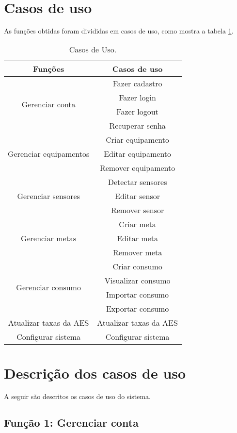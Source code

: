 \section{Casos de uso}
As funções obtidas foram divididas em casos de uso, como mostra a tabela \ref{tab:casos_de_uso}.
%
\begin{table}[H]
\centering
{\renewcommand{\arraystretch}{1.5}
\renewcommand{\tabcolsep}{0.2cm}
\begin{tabular}{|c|c|}
\hline
\textbf{Funções} & \textbf{Casos de uso} \\
\hline
\multirow{4}{*}{Gerenciar conta} & Fazer cadastro\\
& Fazer login\\
& Fazer logout\\
& Recuperar senha\\
\hline
\multirow{3}{*}{Gerenciar equipamentos} & Criar equipamento\\
& Editar equipamento\\
& Remover equipamento\\
\hline
\multirow{3}{*}{Gerenciar sensores} & Detectar sensores\\
& Editar sensor\\
& Remover sensor\\
\hline
\multirow{3}{*}{Gerenciar metas} & Criar meta\\
& Editar meta\\
& Remover meta\\
\hline
\multirow{4}{*}{Gerenciar consumo} & Criar consumo\\
& Visualizar consumo\\
& Importar consumo\\
& Exportar consumo\\
\hline
Atualizar taxas da AES & Atualizar taxas da AES\\
\hline
Configurar sistema & Configurar sistema\\
\hline
\end{tabular}}
\caption{\label{tab:casos_de_uso} Casos de Uso.}
\end{table}
%
\section{Descrição dos casos de uso}
A seguir são descritos os casos de uso do sistema. 
%
\subsection{Função 1: Gerenciar conta}


